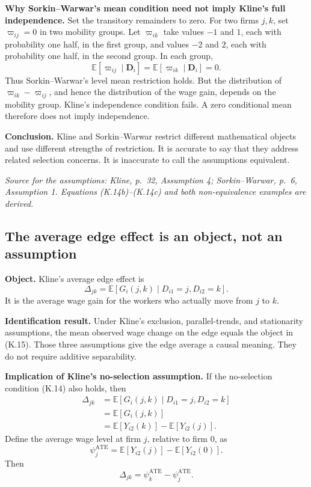\documentclass[11pt]{article}
\begin{document}
\textbf{Why Sorkin--Warwar's mean condition need not imply Kline's full
independence.}
Set the transitory remainders to zero.  For two firms \(j,k\), set
\(\varpi_{ij}=0\) in two mobility groups.  Let
\(\varpi_{ik}\) take values \(-1\) and \(1\), each with probability one
half, in the first group, and values \(-2\) and \(2\), each with probability
one half, in the second group.  In each group,
\[
\mathbb E[\varpi_{ij}\mid\mathbf D_i]
=
\mathbb E[\varpi_{ik}\mid\mathbf D_i]
=0.
\tag{K.14d}
\]
Thus Sorkin--Warwar's level mean restriction holds.  But the distribution
of \(\varpi_{ik}-\varpi_{ij}\), and hence the distribution of the wage gain,
depends on the mobility group.  Kline's independence condition fails.  A
zero conditional mean therefore does not imply independence.

\textbf{Conclusion.}
Kline and Sorkin--Warwar restrict different mathematical objects and use
different strengths of restriction.  It is accurate to say that they
address related selection concerns.  It is inaccurate to call the
assumptions equivalent.

\textit{Source for the assumptions: Kline, p.\ 32, Assumption 4;
Sorkin--Warwar, p.\ 6, Assumption 1.  Equations (K.14b)--(K.14c) and both
non-equivalence examples are derived.}

\subsection{The average edge effect is an object, not an assumption}

\textbf{Object.}
Kline's average edge effect is
\[
\Delta_{jk}
=
\mathbb E[
G_i(j,k)
\mid D_{i1}=j,D_{i2}=k].
\tag{K.15}
\]
It is the average wage gain for the workers who actually move from \(j\) to
\(k\).

\textbf{Identification result.}
Under Kline's exclusion, parallel-trends, and stationarity assumptions, the
mean observed wage change on the edge equals the object in (K.15).  Those
three assumptions give the edge average a causal meaning.  They do not
require additive separability.

\textbf{Implication of Kline's no-selection assumption.}
If the no-selection condition (K.14) also holds, then
\[
\begin{aligned}
\Delta_{jk}
&=
\mathbb E[
G_i(j,k)
\mid D_{i1}=j,D_{i2}=k]\\
&=
\mathbb E[G_i(j,k)]\\
&=
\mathbb E[Y_{i2}(k)]
-\mathbb E[Y_{i2}(j)].
\end{aligned}
\tag{K.16}
\]
Define the average wage level at firm \(j\), relative to firm \(0\), as
\[
\psi_j^{\mathrm{ATE}}
=
\mathbb E[Y_{i2}(j)]
-\mathbb E[Y_{i2}(0)].
\tag{K.17}
\]
Then
\[
\Delta_{jk}
=
\psi_k^{\mathrm{ATE}}
-\psi_j^{\mathrm{ATE}}.
\tag{K.18}
\]
\end{document}
